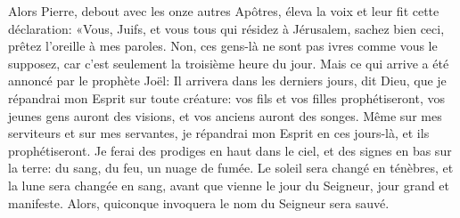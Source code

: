 Alors Pierre, debout avec les onze autres Apôtres,
	éleva la voix et leur fit cette déclaration:
	«Vous, Juifs, et vous tous qui résidez à Jérusalem,
	sachez bien ceci, prêtez l’oreille à mes paroles.
Non, ces gens-là ne sont pas ivres comme vous le supposez,
	car c’est seulement la troisième heure du jour.
Mais ce qui arrive a été annoncé par le prophète Joël:
	Il arrivera dans les derniers jours, dit Dieu,
	que je répandrai mon Esprit sur toute créature:
	vos fils et vos filles prophétiseront, vos jeunes gens auront des visions,
	et vos anciens auront des songes.
Même sur mes serviteurs et sur mes servantes,
	je répandrai mon Esprit en ces jours-là, et ils prophétiseront.
Je ferai des prodiges en haut dans le ciel, et des signes en bas sur la terre:
	du sang, du feu, un nuage de fumée.
Le soleil sera changé en ténèbres, et la lune sera changée en sang,
	avant que vienne le jour du Seigneur, jour grand et manifeste.
Alors, quiconque invoquera le nom du Seigneur sera sauvé.
